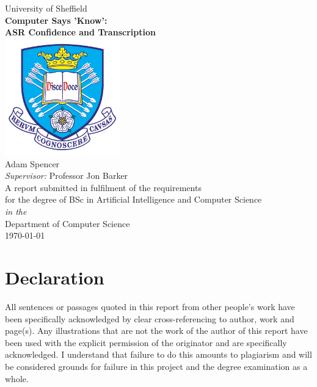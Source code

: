 \documentclass[11pt,oneside]{book}
\begin{document}
\frontmatter

\begin{titlepage}


\begin{center}
{\LARGE University of Sheffield}\\[1.5cm]
\linespread{1.2}\huge {\bfseries Computer Says 'Know': \\ASR Confidence and Transcription}\\[1.5cm]
\linespread{1}
\includegraphics[width=5cm]{images/tuoslogo}\\[1cm]
{\Large Adam Spencer}\\[1cm]
{\large \emph{Supervisor:} Professor Jon Barker}\\[1cm]
\large A report submitted in fulfilment of the requirements\\ for the degree of BSc in Artificial Intelligence and Computer Science\\[0.3cm] 
\textit{in the}\\[0.3cm]
Department of Computer Science\\[2cm]
\today
\end{center}

\end{titlepage}


\newpage
\chapter*{\Large Declaration}


All sentences or passages quoted in this report from other people's work have been specifically acknowledged by clear cross-referencing to author, work and page(s). Any illustrations that are not the work of the author of this report have been used with the explicit permission of the originator and are specifically acknowledged. I understand that failure to do this amounts to plagiarism and will be considered grounds for failure in this project and the degree examination as a whole.\\[1cm]
\end{document}
